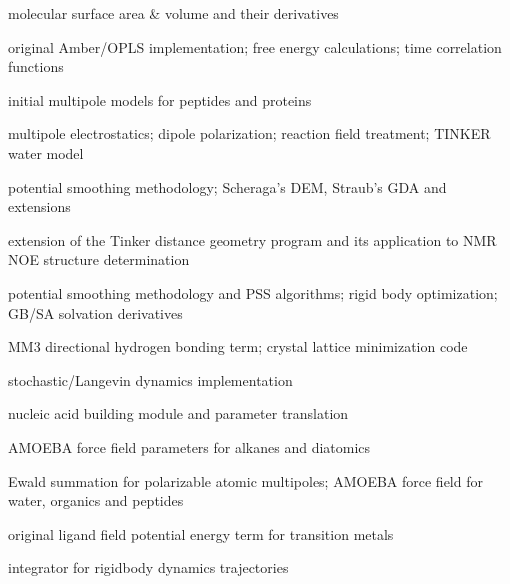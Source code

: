\documentclass[letterpaper,11pt,english]{sphinxmanual}
\begin{document}

molecular surface area \& volume and their derivatives


original Amber/OPLS implementation; free energy calculations; time correlation functions


initial multipole models for peptides and proteins


multipole electrostatics; dipole polarization; reaction field treatment; TINKER water model


potential smoothing methodology; Scheraga’s DEM, Straub’s GDA and extensions


extension of the Tinker distance geometry program and its application to NMR NOE structure determination


potential smoothing methodology and PSS algorithms; rigid body optimization; GB/SA solvation derivatives


MM3 directional hydrogen bonding term; crystal lattice minimization code


stochastic/Langevin dynamics implementation


nucleic acid building module and parameter translation


AMOEBA force field parameters for alkanes and diatomics


Ewald summation for polarizable atomic multipoles; AMOEBA force field for water, organics and peptides


original ligand field potential energy term for transition metals


integrator for rigid\sphinxhyphen{}body dynamics trajectories
\end{document}
